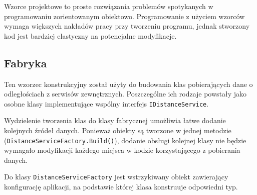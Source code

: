 Wzorce projektowe to proste rozwiązania problemów spotykanych w programowaniu zorientowanym obiektowo\cite{wzorce}. Programowanie z użyciem wzorców wymaga większych nakładów pracy przy tworzeniu programu, jednak stworzony kod jest bardziej elastyczny na potencjalne modyfikacje.

\subsection*{Fabryka}
Ten wzorzec konstrukcyjny został użyty do budowania klas pobierających dane o odległościach z serwisów zewnętrznych. Poszczególne ich rodzaje powstały jako osobne klasy implementujące wspólny interfejs \texttt{IDistanceService}.

Wydzielenie tworzenia klas do klasy fabrycznej umożliwia łatwe dodanie kolejnych źródeł danych. Ponieważ obiekty są tworzone w jednej metodzie (\texttt{DistanceServiceFactory.Build()}), dodanie obsługi kolejnej klasy nie będzie wymagało modyfikacji każdego miejsca w kodzie korzystającego z pobierania danych.

Do klasy \texttt{DistanceServiceFactory} jest wstrzykiwany obiekt zawierający konfigurację aplikacji, na podstawie której klasa konstruuje odpowiedni typ.

